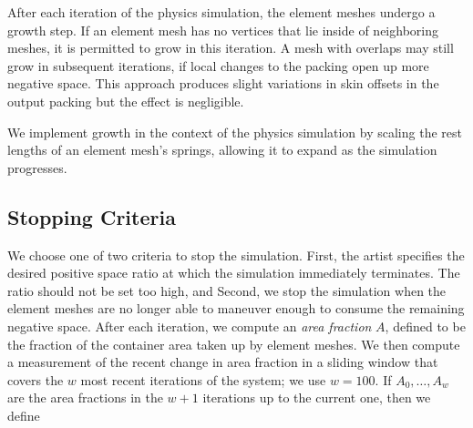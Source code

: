 After each iteration of the physics simulation, the element meshes undergo
a growth step.  If an element mesh has no vertices that lie inside of
neighboring meshes, it is permitted to grow in this iteration.  A mesh with
overlaps may still grow in subsequent iterations, if local changes to the 
packing open up more negative space.
This approach produces slight variations in skin offsets in the output packing
but the effect is negligible.

We implement growth in the context of the physics simulation by scaling
the rest lengths of an element mesh's springs, allowing it to expand as the simulation
progresses.  




\subsection{Stopping Criteria}
\label{repulsionpak_stopping_criteria}


We choose one of two criteria to stop the simulation. First, the artist specifies 
the desired positive space ratio at which the simulation immediately terminates.
The ratio should not be set too high, and
Second, we stop the simulation when the element meshes are no longer
able to maneuver enough to consume the remaining negative space. 
After each iteration, we compute an \textit{area fraction} $A$, defined to be the fraction of
the container area taken up by element meshes.  We then compute a measurement
of the recent change in area fraction in a sliding window that covers the $w$
most recent iterations of the system; we use $w=100$.  If $A_0,\ldots,A_w$
are the area fractions in the $w+1$ iterations up to the current one, then we
define

